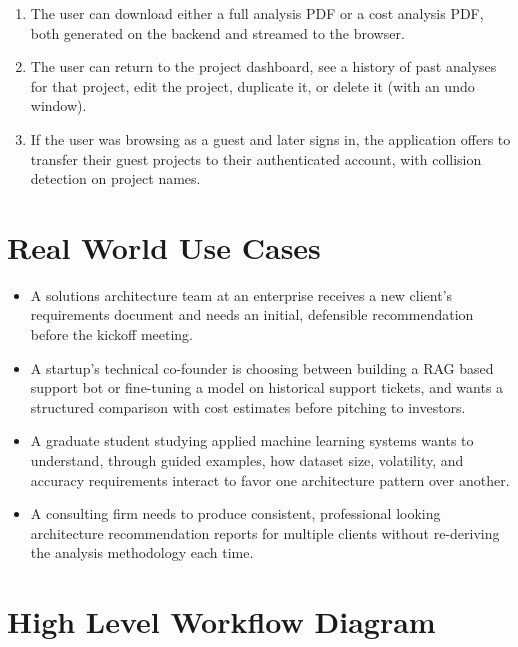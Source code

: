 \documentclass[11pt,a4paper]{report}
\begin{document}
\begin{enumerate}[leftmargin=*]
  \item The user can download either a full analysis PDF or a cost analysis PDF, both generated on the backend and streamed to the browser.
  \item The user can return to the project dashboard, see a history of past analyses for that project, edit the project, duplicate it, or delete it (with an undo window).
  \item If the user was browsing as a guest and later signs in, the application offers to transfer their guest projects to their authenticated account, with collision detection on project names.
\end{enumerate}

\section{Real World Use Cases}

\begin{itemize}[leftmargin=*]
  \item A solutions architecture team at an enterprise receives a new client's requirements document and needs an initial, defensible recommendation before the kickoff meeting.
  \item A startup's technical co-founder is choosing between building a RAG based support bot or fine-tuning a model on historical support tickets, and wants a structured comparison with cost estimates before pitching to investors.
  \item A graduate student studying applied machine learning systems wants to understand, through guided examples, how dataset size, volatility, and accuracy requirements interact to favor one architecture pattern over another.
  \item A consulting firm needs to produce consistent, professional looking architecture recommendation reports for multiple clients without re-deriving the analysis methodology each time.
\end{itemize}

\section{High Level Workflow Diagram}
\end{document}
